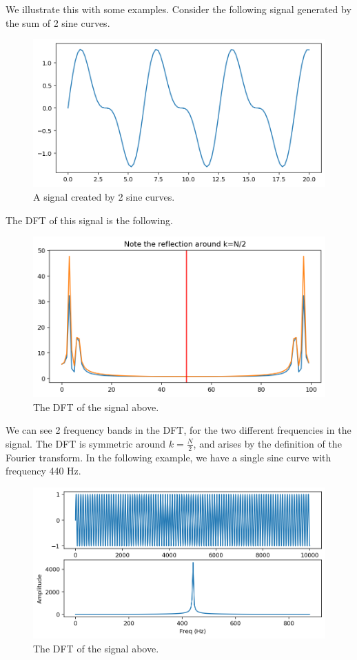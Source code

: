 \documentclass[a4paper, openany]{memoir}
\begin{document}
We illustrate this with some examples. Consider the following signal generated by the sum of 2 sine curves.
\begin{figure}[H]
    \centering
    \includegraphics[scale=0.5]{src/6.21 sine curves.png}
    \caption{A signal created by 2 sine curves.}
\end{figure}
The DFT of this signal is the following.
\begin{figure}[H]
    \centering
    \includegraphics[scale=0.5]{src/6.22 sine curves dft.png}
    \caption{The DFT of the signal above.}
\end{figure}
\noindent We can see 2 frequency bands in the DFT, for the two different frequencies in the signal. The DFT is symmetric around $k = \frac{N}{2}$, and arises by the definition of the Fourier transform. In the following example, we have a single sine curve with frequency 440 Hz.
\begin{figure}[H]
    \centering
    \includegraphics[scale=0.5]{src/6.23 sine to DFT frequency.png}
    \caption{The DFT of the signal above.}
\end{figure}
\end{document}
